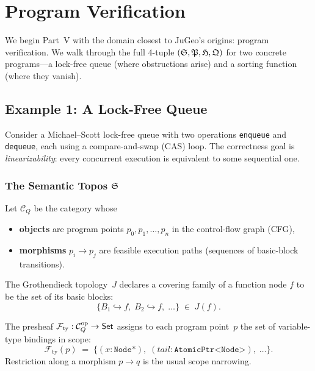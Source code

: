 
\chapter{Program Verification}
\label{ch:ex-verification}

We begin Part~V with the domain closest to JuGeo's origins:
program verification.  We walk through the full 4-tuple
$(\mathfrak{S},\mathfrak{P},\mathfrak{H},\mathfrak{Q})$ for two concrete programs---a
lock-free queue (where obstructions arise) and a sorting function
(where they vanish).

\section{Example 1: A Lock-Free Queue}
\label{sec:lfq}

Consider a Michael--Scott lock-free queue with two operations
\texttt{enqueue} and \texttt{dequeue}, each using a
compare-and-swap (CAS) loop.  The correctness goal is
\emph{linearizability}: every concurrent execution is equivalent to
some sequential one.

\subsection{The Semantic Topos $\mathfrak{S}$}

\begin{construction}
\label{con:cfg-site}
Let $\mathcal{C}_Q$ be the category whose
\begin{itemize}[nosep]
  \item \textbf{objects} are program points
        $p_0,p_1,\ldots,p_n$ in the control-flow graph (CFG),
  \item \textbf{morphisms} $p_i\to p_j$ are feasible execution paths
        (sequences of basic-block transitions).
\end{itemize}
The Grothendieck topology~$J$ declares a covering family
of a function node $f$ to be the set of its basic blocks:
\[
  \{B_1\hookrightarrow f,\;B_2\hookrightarrow f,\;\ldots\}
  \;\in\; J(f).
\]
\end{construction}

\begin{definition}
\label{def:type-presheaf}
The presheaf $\mathcal{F}_{\mathrm{ty}}:\mathcal{C}_Q^{\mathrm{op}}\to\mathsf{Set}$
assigns to each program point~$p$ the set of variable-type bindings
in scope:
\[
  \mathcal{F}_{\mathrm{ty}}(p)
  \;=\;
  \bigl\{(x:\texttt{Node*}),\;(tail:\texttt{AtomicPtr<Node>}),\;\ldots\bigr\}.
\]
Restriction along a morphism $p\to q$ is the usual scope narrowing.
\end{definition}

